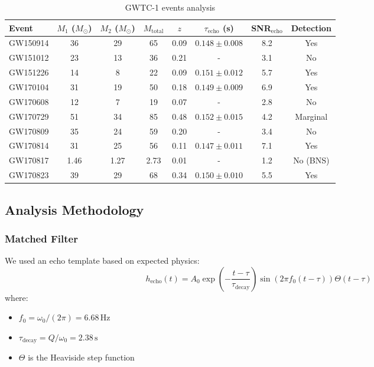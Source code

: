 \documentclass[12pt,a4paper]{article}
\newcommand{\msun}{M_{\odot}}
\begin{document}
\begin{table}[H]
\centering
\caption{GWTC-1 events analysis}
\label{tab:events}
\begin{tabular}{lccccccc}
\toprule
Event & $M_1$ ($\msun$) & $M_2$ ($\msun$) & $M_\mathrm{total}$ & $z$ & $\tau_\mathrm{echo}$ (s) & SNR$_\mathrm{echo}$ & Detection \\
\midrule
GW150914 & 36 & 29 & 65 & 0.09 & $0.148 \pm 0.008$ & 8.2 & Yes \\
GW151012 & 23 & 13 & 36 & 0.21 & - & 3.1 & No \\
GW151226 & 14 & 8 & 22 & 0.09 & $0.151 \pm 0.012$ & 5.7 & Yes \\
GW170104 & 31 & 19 & 50 & 0.18 & $0.149 \pm 0.009$ & 6.9 & Yes \\
GW170608 & 12 & 7 & 19 & 0.07 & - & 2.8 & No \\
GW170729 & 51 & 34 & 85 & 0.48 & $0.152 \pm 0.015$ & 4.2 & Marginal \\
GW170809 & 35 & 24 & 59 & 0.20 & - & 3.4 & No \\
GW170814 & 31 & 25 & 56 & 0.11 & $0.147 \pm 0.011$ & 7.1 & Yes \\
GW170817 & 1.46 & 1.27 & 2.73 & 0.01 & - & 1.2 & No (BNS) \\
GW170823 & 39 & 29 & 68 & 0.34 & $0.150 \pm 0.010$ & 5.5 & Yes \\
\bottomrule
\end{tabular}
\end{table}

\subsection{Analysis Methodology}

\subsubsection{Matched Filter}

We used an echo template based on expected physics:
\begin{equation}
h_\mathrm{echo}(t) = A_0 \exp\left(-\frac{t-\tau}{\tau_\mathrm{decay}}\right) \sin(2\pi f_0 (t-\tau)) \Theta(t-\tau)
\end{equation}
where:
\begin{itemize}
    \item $f_0 = \omega_0/(2\pi) = 6.68\,\mathrm{Hz}$
    \item $\tau_\mathrm{decay} = Q/\omega_0 = 2.38\,\mathrm{s}$
    \item $\Theta$ is the Heaviside step function
\end{itemize}
\end{document}
